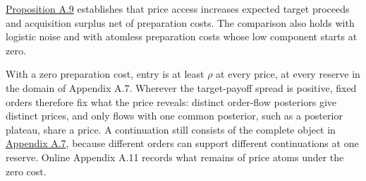 
\hyperref[result-proposition-a-9]{Proposition A.9} establishes that
price access increases expected target proceeds and acquisition surplus
net of preparation costs. The comparison also holds with logistic noise
and with atomless preparation costs whose low component starts at zero.

With a zero preparation cost, entry is at least \(\rho\) at every price, at every reserve in
the domain of Appendix A.7. Wherever the target-payoff spread is positive, fixed orders
therefore fix what the price reveals: distinct order-flow posteriors give distinct prices,
and only flows with one common posterior, such as a posterior plateau, share a price.
A continuation still consists of the complete object in
\hyperref[pa-design]{Appendix A.7}, because different orders can support different
continuations at one reserve. Online Appendix A.11 records what remains of price atoms
under the zero cost.
